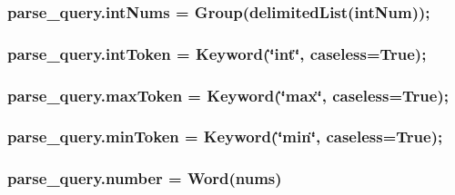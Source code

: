 \subsubsection[{\texorpdfstring{int\+Nums}{intNums}}]{\setlength{\rightskip}{0pt plus 5cm}parse\+\_\+query.\+int\+Nums = Group(delimited\+List({\bf int\+Num}));}\hypertarget{namespaceparse__query_ac182cdcf0ecfe237fbb9d43ec2950f2d}{}\label{namespaceparse__query_ac182cdcf0ecfe237fbb9d43ec2950f2d}
\subsubsection[{\texorpdfstring{int\+Token}{intToken}}]{\setlength{\rightskip}{0pt plus 5cm}parse\+\_\+query.\+int\+Token = Keyword(\char`\"{}int\char`\"{}, caseless=True);}\hypertarget{namespaceparse__query_ad3fcd102f8a00826a83a1e8a921760d0}{}\label{namespaceparse__query_ad3fcd102f8a00826a83a1e8a921760d0}
\subsubsection[{\texorpdfstring{max\+Token}{maxToken}}]{\setlength{\rightskip}{0pt plus 5cm}parse\+\_\+query.\+max\+Token = Keyword(\char`\"{}max\char`\"{}, caseless=True);}\hypertarget{namespaceparse__query_a1189a8897d300e08d3d4b00224482d79}{}\label{namespaceparse__query_a1189a8897d300e08d3d4b00224482d79}
\subsubsection[{\texorpdfstring{min\+Token}{minToken}}]{\setlength{\rightskip}{0pt plus 5cm}parse\+\_\+query.\+min\+Token = Keyword(\char`\"{}min\char`\"{}, caseless=True);}\hypertarget{namespaceparse__query_a70846ee64743086995f9e5a5cf892eca}{}\label{namespaceparse__query_a70846ee64743086995f9e5a5cf892eca}
\subsubsection[{\texorpdfstring{number}{number}}]{\setlength{\rightskip}{0pt plus 5cm}parse\+\_\+query.\+number = Word(nums)}\hypertarget{namespaceparse__query_a709ffd51e32f7b162656bb861d5d374d}{}\label{namespaceparse__query_a709ffd51e32f7b162656bb861d5d374d}
